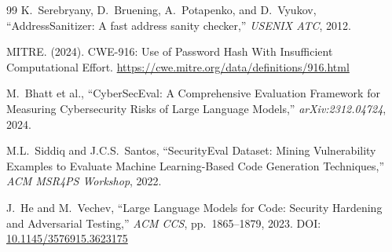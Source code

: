 \documentclass[10pt,twocolumn]{article}
\begin{document}
\begin{thebibliography}{99}
K.\ Serebryany, D.\ Bruening, A.\ Potapenko, and D.\ Vyukov,
``AddressSanitizer: A fast address sanity checker,''
\textit{USENIX ATC}, 2012.

MITRE. (2024). CWE-916: Use of Password Hash With Insufficient
Computational Effort.
\url{https://cwe.mitre.org/data/definitions/916.html}

M.\ Bhatt et al., ``CyberSecEval: A Comprehensive Evaluation Framework
for Measuring Cybersecurity Risks of Large Language Models,''
\textit{arXiv:2312.04724}, 2024.

M.L.\ Siddiq and J.C.S.\ Santos, ``SecurityEval Dataset: Mining
Vulnerability Examples to Evaluate Machine Learning-Based Code
Generation Techniques,'' \textit{ACM MSR4PS Workshop}, 2022.

J.\ He and M.\ Vechev, ``Large Language Models for Code: Security
Hardening and Adversarial Testing,'' \textit{ACM CCS},
pp.\ 1865--1879, 2023.
DOI: \href{https://doi.org/10.1145/3576915.3623175}{10.1145/3576915.3623175}

\end{thebibliography}
\end{document}
